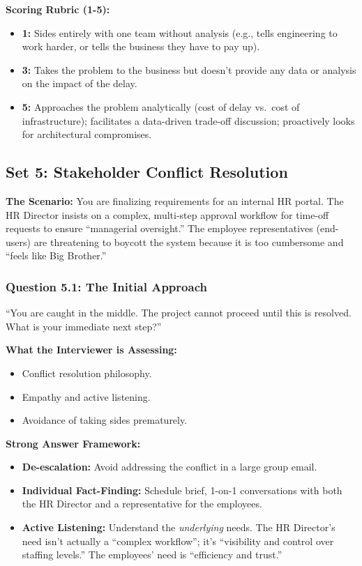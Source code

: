 \textbf{Scoring Rubric (1-5):}

\begin{itemize}
\tightlist
\item
  \textbf{1:} Sides entirely with one team without analysis (e.g., tells
  engineering to work harder, or tells the business they have to pay
  up).
\item
  \textbf{3:} Takes the problem to the business but doesn't provide any
  data or analysis on the impact of the delay.
\item
  \textbf{5:} Approaches the problem analytically (cost of delay
  vs.~cost of infrastructure); facilitates a data-driven trade-off
  discussion; proactively looks for architectural compromises.
\end{itemize}

\bigskip

\subsection{Set 5: Stakeholder Conflict
Resolution}\label{set-5-stakeholder-conflict-resolution}

\textbf{The Scenario:} You are finalizing requirements for an internal
HR portal. The HR Director insists on a complex, multi-step approval
workflow for time-off requests to ensure ``managerial oversight.'' The
employee representatives (end-users) are threatening to boycott the
system because it is too cumbersome and ``feels like Big Brother.''

\subsubsection{Question 5.1: The Initial
Approach}\label{question-5.1-the-initial-approach}

``You are caught in the middle. The project cannot proceed until this is
resolved. What is your immediate next step?''

\textbf{What the Interviewer is Assessing:}

\begin{itemize}
\tightlist
\item
  Conflict resolution philosophy.
\item
  Empathy and active listening.
\item
  Avoidance of taking sides prematurely.
\end{itemize}

\textbf{Strong Answer Framework:}

\begin{itemize}
\tightlist
\item
  \textbf{De-escalation:} Avoid addressing the conflict in a large group
  email.
\item
  \textbf{Individual Fact-Finding:} Schedule brief, 1-on-1 conversations
  with both the HR Director and a representative for the employees.
\item
  \textbf{Active Listening:} Understand the \emph{underlying} needs. The
  HR Director's need isn't actually a ``complex workflow''; it's
  ``visibility and control over staffing levels.'' The employees' need
  is ``efficiency and trust.''
\end{itemize}

